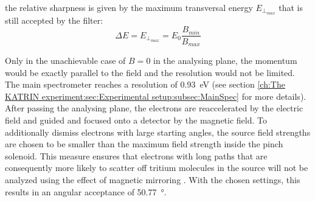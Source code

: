 		the relative sharpness is given by the maximum transversal energy $E_{\bot_{max}}$ that is still accepted by the filter:
		\begin{equation}
		\Delta E = E_{\bot_{max}} = E_{0}\frac{B_{min}}{B_{max}}
		\end{equation}
		
		Only in the unachievable case of $B = 0$ in the analysing plane, the momentum would be exactly parallel to the field and the resolution would not be limited. The main spectrometer reaches a resolution of \SI{0.93}{\electronvolt} (see section \ref{ch:The KATRIN experiment:sec:Experimental setup:subsec:MainSpec} for more details).
		After passing the analysing plane, the electrons are reaccelerated by the electric field and guided and focused onto a detector by the magnetic field.
		To additionally dismiss electrons with large starting angles, the source field strengths are chosen to be smaller than the maximum field strength inside the pinch solenoid. This measure ensures that electrons with long paths that are consequently more likely to scatter off tritium molecules in the source will not be analyzed using the effect of magnetic mirroring \cite{magneticMirror}.
		With the chosen settings, this results in an angular acceptance of \SI{50.77}{\degree}. 
%       

      

